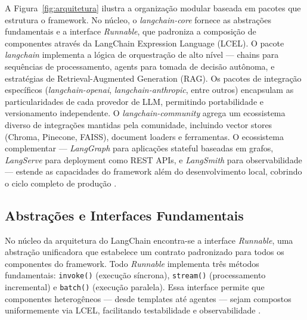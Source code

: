\documentclass[12pt]{article}
\begin{document}

A Figura~\ref{fig:arquitetura} ilustra a organização modular baseada em pacotes que estrutura o framework. No núcleo, o \textit{langchain-core} fornece as abstrações fundamentais e a interface \textit{Runnable}, que padroniza a composição de componentes através da LangChain Expression Language (LCEL). O pacote \textit{langchain} implementa a lógica de orquestração de alto nível — chains para sequências de processamento, agents para tomada de decisão autônoma, e estratégias de Retrieval-Augmented Generation (RAG). Os pacotes de integração específicos (\textit{langchain-openai}, \textit{langchain-anthropic}, entre outros) encapsulam as particularidades de cada provedor de LLM, permitindo portabilidade e versionamento independente. O \textit{langchain-community} agrega um ecossistema diverso de integrações mantidas pela comunidade, incluindo vector stores (Chroma, Pinecone, FAISS), document loaders e ferramentas. O ecossistema complementar — \textit{LangGraph} para aplicações stateful baseadas em grafos, \textit{LangServe} para deployment como REST APIs, e \textit{LangSmith} para observabilidade — estende as capacidades do framework além do desenvolvimento local, cobrindo o ciclo completo de produção \cite{langchain2023docs}.

\subsection{Abstrações e Interfaces Fundamentais}
\label{subsec:abstracoes}


No núcleo da arquitetura do LangChain encontra-se a interface \textit{Runnable}, uma abstração unificadora que estabelece um contrato padronizado para todos os componentes do framework. Todo \textit{Runnable} implementa três métodos fundamentais: \texttt{invoke()} (execução síncrona), \texttt{stream()} (processamento incremental) e \texttt{batch()} (execução paralela). Essa interface permite que componentes heterogêneos — desde templates até agentes — sejam compostos uniformemente via LCEL, facilitando testabilidade e observabilidade \cite{langchain2023docs}.
\end{document}
